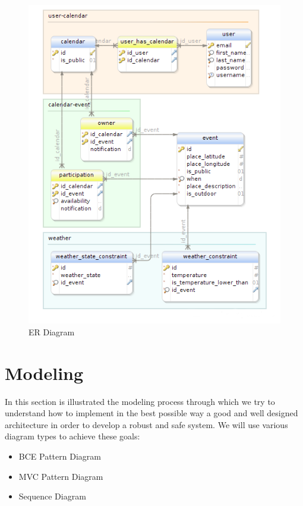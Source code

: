  \begin{center}
 \begin{figure}[H]
    \includegraphics[width=1\textwidth]{../ERDiagram/er/er.png}
    \caption{ER Diagram}
     \label{fig:er}
     \end{figure}
   \end{center}  
\section{Modeling}
In this section is illustrated the modeling process through which we try to understand how to implement in the best possible way a good and well designed architecture in order to develop a robust and safe system. We will use various diagram types to achieve these goals: \begin{itemize}
\item BCE Pattern Diagram
\item MVC Pattern Diagram
\item Sequence Diagram
\end{itemize}
